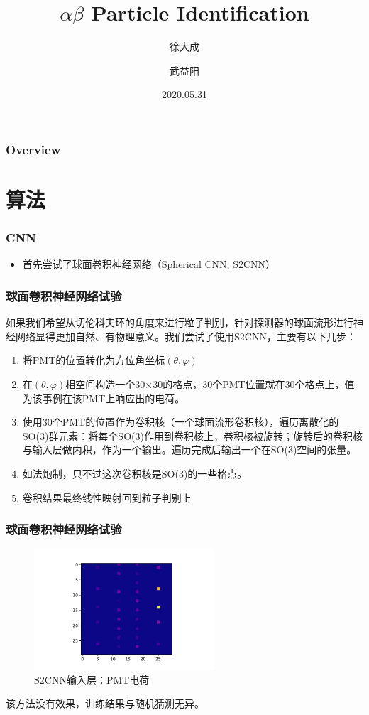 \documentclass{beamer}
\title[Identify]{$\alpha \beta$ Particle Identification}
\author[xOasis]{徐大成 \and 武益阳}
\institute[THU]{清华大学}
\date{2020.05.31}
\begin{document}
\frame{\titlepage}

\begin{frame}
\frametitle{Overview}
\tableofcontents
\end{frame}

\section{算法}

\begin{frame}
\frametitle{CNN}
\begin{itemize}
    \item 首先尝试了球面卷积神经网络（Spherical CNN, S2CNN）
\end{itemize}
\end{frame}

\begin{frame}
\frametitle{球面卷积神经网络试验}
如果我们希望从切伦科夫环的角度来进行粒子判别，针对探测器的球面流形进行神经网络显得更加自然、有物理意义。我们尝试了使用S2CNN，主要有以下几步：
\begin{enumerate}
    \item <1-> 将PMT的位置转化为方位角坐标$(\theta, \varphi)$
    \item <2-> 在$(\theta, \varphi)$相空间构造一个30$\times$30的格点，30个PMT位置就在30个格点上，值为该事例在该PMT上响应出的电荷。
    \item <3-> 使用30个PMT的位置作为卷积核（一个球面流形卷积核），遍历离散化的SO(3)群元素：将每个SO(3)作用到卷积核上，卷积核被旋转；旋转后的卷积核与输入层做内积，作为一个输出。遍历完成后输出一个在SO(3)空间的张量。
    \item <4-> 如法炮制，只不过这次卷积核是SO(3)的一些格点。
    \item <5-> 卷积结果最终线性映射回到粒子判别上
\end{enumerate}
\end{frame}

\begin{frame}
\frametitle{球面卷积神经网络试验}
\begin{figure}[H]
    \centering
    \includegraphics[width=0.6\textwidth]{S2CNN_input.pdf}
    \caption{S2CNN输入层：PMT电荷}
    \label{fig:S2CNN_input}
\end{figure}
该方法没有效果，训练结果与随机猜测无异。
\end{frame}
\end{document}
